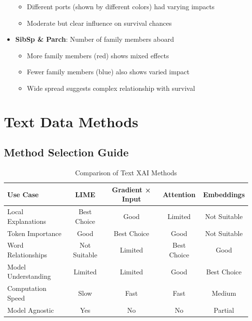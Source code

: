 \documentclass{article}
\begin{document}
\begin{itemize}
        \begin{itemize}
            \item Different ports (shown by different colors) had varying impacts
            \item Moderate but clear influence on survival chances
        \end{itemize}
    \item \textbf{SibSp \& Parch}: Number of family members aboard
        \begin{itemize}
            \item More family members (red) shows mixed effects
            \item Fewer family members (blue) also shows varied impact
            \item Wide spread suggests complex relationship with survival
        \end{itemize}
\end{itemize}

\pagebreak
\section{Text Data Methods}

\subsection{Method Selection Guide}
\begin{table}[h]
\caption{Comparison of Text XAI Methods}
\begin{center}
\small
\begin{tabular}{|l|c|c|c|c|}
\hline
\textbf{Use Case} & \textbf{LIME} & \textbf{Gradient × Input} & \textbf{Attention} & \textbf{Embeddings} \\
\hline
Local Explanations & Best Choice & Good & Limited & Not Suitable \\
\hline
Token Importance & Good & Best Choice & Good & Not Suitable \\
\hline
Word Relationships & Not Suitable & Limited & Best Choice & Good \\
\hline
Model Understanding & Limited & Limited & Good & Best Choice \\
\hline
Computation Speed & Slow & Fast & Fast & Medium \\
\hline
Model Agnostic & Yes & No & No & Partial \\
\hline
\end{tabular}
\end{center}
\end{table}
\end{document}
